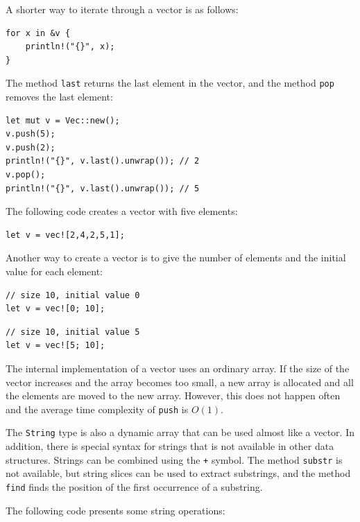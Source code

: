 \begin{samepage}
A shorter way to iterate through a vector is as follows:

\begin{lstlisting}
for x in &v {
    println!("{}", x);
}
\end{lstlisting}
\end{samepage}

The method \texttt{last} returns the last element
in the vector, and
the method \texttt{pop} removes the last element:

\begin{lstlisting}
let mut v = Vec::new();
v.push(5);
v.push(2);
println!("{}", v.last().unwrap()); // 2
v.pop();
println!("{}", v.last().unwrap()); // 5
\end{lstlisting}

The following code creates a vector with five elements:

\begin{lstlisting}
let v = vec![2,4,2,5,1];
\end{lstlisting}

Another way to create a vector is to give the number
of elements and the initial value for each element:

\begin{lstlisting}
// size 10, initial value 0
let v = vec![0; 10];
\end{lstlisting}
\begin{lstlisting}
// size 10, initial value 5
let v = vec![5; 10];
\end{lstlisting}

The internal implementation of a vector
uses an ordinary array.
If the size of the vector increases and
the array becomes too small,
a new array is allocated and all the
elements are moved to the new array.
However, this does not happen often and the
average time complexity of
\texttt{push} is $O(1)$.


The \texttt{String} type
is also a dynamic array that can be used almost like a vector.
In addition, there is special syntax for strings
that is not available in other data structures.
Strings can be combined using the \texttt{+} symbol.
The method \texttt{substr} is not available,
but string slices can be used to extract substrings,
and the method \texttt{find} finds the position
of the first occurrence of a substring.

The following code presents some string operations:

